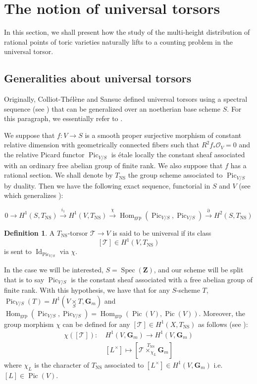 \documentclass{proc-l}
\newcommand{\Z}{\mathbf{Z}}
\newcommand{\G}{\mathbf{G}}
\DeclareMathOperator{\Spec}{Spec}
\DeclareMathOperator{\Pic}{Pic}
\DeclareMathOperator{\id}{Id}
\DeclareMathOperator{\grp}{grp}
\DeclareMathOperator{\Hom}{Hom}
\DeclareMathOperator{\NS}{NS}
\newcommand{\stackT}{\mathcal{T}}
\newcommand{\sheafO}{\mathcal{O}}
\theoremstyle{definition}
\newtheorem{definition}[theorem]{Definition}
\theoremstyle{remark}
\numberwithin{equation}{section}
\begin{document}
\section{The notion of universal torsors}

In this section, we shall present how the study of the multi-height distribution of rational points of toric varieties naturally lifts to a counting problem in the universal torsor.

\subsection{Generalities about universal torsors}

Originally, Colliot-Thélène and Sansuc defined universal torsors using a spectral sequence (see \cite[section 2]{ColliotTheleneSansuc1987}) that can be generalized over an noetherian base scheme $S$. For this paragraph, we essentially refer to \cite[section 5]{salberger_torsor}.

We suppose that $ f : V \rightarrow S$ is a smooth proper surjective morphism of constant relative dimension with geometrically connected fibers such that $R^2 f_* \sheafO_V = 0 $ and the relative Picard functor $\Pic_{V/S}$ is étale locally the constant sheaf associated with an ordinary free abelian group of finite rank. We also suppose that $f$ has a rational section. We shall denote by $T_{\NS}$ the group scheme associated to $\Pic_{V/S}$ by duality. Then we have the following exact sequence, functorial in $S$ and $V$ (see \cite[section 5, p.163]{salberger_torsor} which generalizes \cite[2.0.2]{ColliotTheleneSansuc1987}):

$$ 0 \rightarrow H^1(S,T_{\NS}) \xrightarrow{i_1} H^1(V,T_{\NS}) \xrightarrow{\chi} \Hom_{\grp}(\Pic_{V/S},\Pic_{V/S}) \xrightarrow{\partial} H^2(S,T_{\NS})$$

\begin{definition}
    A $T_{\NS}$-torsor $\stackT \rightarrow V$ is said to be universal if its class $$[\stackT] \in H^1(V,T_{\NS})$$ is sent to $\id_{\Pic_{V/S}}$ via $\chi$.
\end{definition}

In the case we will be interested, $S = \Spec(\Z)$, and our scheme will be split that is to say  $\Pic_{V/S}$ is the constant sheaf associated with a free abelian group of finite rank. With this hypothesis, we have that for any $S$-scheme $T$, $\Pic_{V/S}(T) = H^1(V \underset{S}{\times} T, \G_m) $ and $\Hom_{\grp}(\Pic_{V/S},\Pic_{V/S}) = \Hom_{\grp}(\Pic(V),\Pic(V))$. Moreover, the group morphism $\chi$ can be defined for any $[\stackT] \in H^1(X,T_{\NS}) $ as follows (see \cite[Definition 2.3.2 and Theorem 2.3.6]{Skorobogatov2001}):
\begin{align*}
    \chi([\stackT]) : \ &H^1(V,\G_m) \rightarrow H^1(V,\G_m) \\
    &[L^{\times}] \longmapsto [\stackT \overset{T_{\NS}}{\times_{\chi_L}} \G_m ]
\end{align*}where $\chi_L$ is the character of $T_{\NS}$ associated to $[L^{\times}] \in H^1(V,\G_m)$ i.e. $[L] \in \Pic(V)$.
\end{document}
